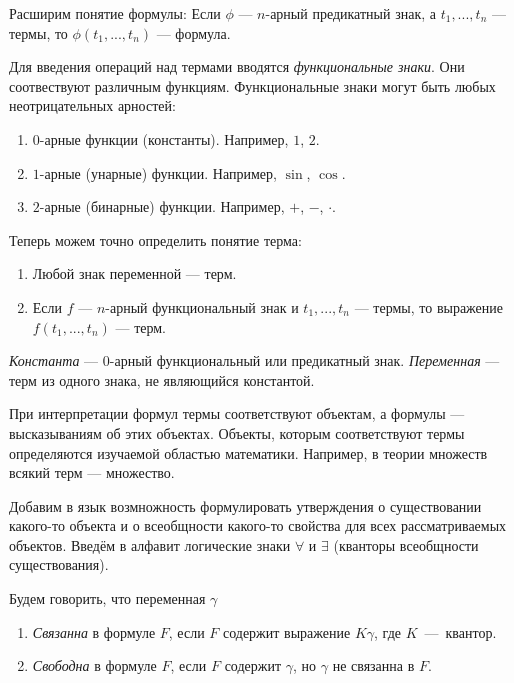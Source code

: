Расширим понятие формулы: Если $\phi$ --- $n$-арный предикатный знак,
а $t_1,...,t_{n}$ --- термы, то $\phi(t_1,...,t_{n})$ --- формула.

Для введения операций над термами вводятся {\it функциональные знаки}.
Они соотвествуют различным функциям. Функциональные знаки могут быть любых
неотрицательных арностей:
\begin{enumerate}
	\item{}$0$-арные функции (константы). Например, $1$, $2$.
	\item{}$1$-арные (унарные) функции. Например, $\sin$, $\cos$.
	\item{}$2$-арные (бинарные) функции. Например, $+$, $-$, $\cdot$.
\end{enumerate}

Теперь можем точно определить понятие терма:
\begin{enumerate}
	\item{}Любой знак переменной --- терм.

	\item{}Если $f$ --- $n$-арный функциональный знак и $t_1,...,t_{n}$ --- термы,
	то выражение $f(t_1,...,t_{n})$ --- терм.
\end{enumerate}

{\it Константа} --- $0$-арный функциональный или предикатный знак.
{\it Переменная} --- терм из одного знака,
не являющийся константой.


При интерпретации формул термы соответствуют объектам, а формулы --- высказываниям
об этих объектах. Объекты, которым соответствуют термы определяются изучаемой
областью математики. Например, в теории множеств всякий терм --- множество.

Добавим в язык возмножность формулировать утверждения о существовании
какого-то объекта и о всеобщности какого-то свойства для всех рассматриваемых объектов.
Введём в алфавит логические знаки $\forall$ и $\exists$
(кванторы всеобщности существования).

Будем говорить, что переменная $\gamma$
\begin{multicols}{2}
	\begin{enumerate}
		\item{}{\it Связанна} в формуле $F$, если $F$ содержит
		выражение $K\gamma$, где $K$~---~квантор.
		\columnbreak
		\item{}{\it Свободна} в формуле $F$, если $F$ содержит $\gamma$,
		но $\gamma$ не связанна в $F$.
	\end{enumerate}
\end{multicols}

